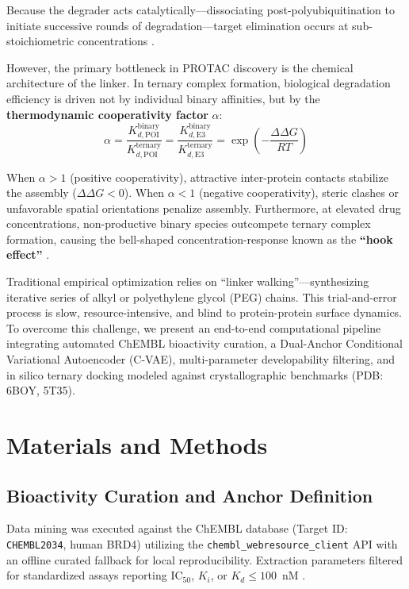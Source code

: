 \documentclass[conference]{IEEEtran}
\begin{document}
Because the degrader acts catalytically—dissociating post-polyubiquitination to initiate successive rounds of degradation—target elimination occurs at sub-stoichiometric concentrations \cite{winter2015}.

However, the primary bottleneck in PROTAC discovery is the chemical architecture of the linker. In ternary complex formation, biological degradation efficiency is driven not by individual binary affinities, but by the \textbf{thermodynamic cooperativity factor} $\alpha$:
\begin{equation}
\alpha = \frac{K_{d,\text{POI}}^{\text{binary}}}{K_{d,\text{POI}}^{\text{ternary}}} = \frac{K_{d,\text{E3}}^{\text{binary}}}{K_{d,\text{E3}}^{\text{ternary}}} = \exp\left(-\frac{\Delta\Delta G}{RT}\right)
\end{equation}

When $\alpha > 1$ (positive cooperativity), attractive inter-protein contacts stabilize the assembly ($\Delta\Delta G < 0$). When $\alpha < 1$ (negative cooperativity), steric clashes or unfavorable spatial orientations penalize assembly. Furthermore, at elevated drug concentrations, non-productive binary species outcompete ternary complex formation, causing the bell-shaped concentration-response known as the \textbf{``hook effect''} \cite{gadd2017}.

Traditional empirical optimization relies on ``linker walking''—synthesizing iterative series of alkyl or polyethylene glycol (PEG) chains. This trial-and-error process is slow, resource-intensive, and blind to protein-protein surface dynamics. To overcome this challenge, we present an end-to-end computational pipeline integrating automated ChEMBL bioactivity curation, a Dual-Anchor Conditional Variational Autoencoder (C-VAE), multi-parameter developability filtering, and in silico ternary docking modeled against crystallographic benchmarks (PDB: 6BOY, 5T35).

\section{Materials and Methods}

\subsection{Bioactivity Curation and Anchor Definition}
Data mining was executed against the ChEMBL database (Target ID: \texttt{CHEMBL2034}, human BRD4) utilizing the \texttt{chembl\_webresource\_client} API with an offline curated fallback for local reproducibility. Extraction parameters filtered for standardized assays reporting $\text{IC}_{50}$, $K_i$, or $K_d \le 100$~nM \cite{gaulton2017}.
\end{document}
